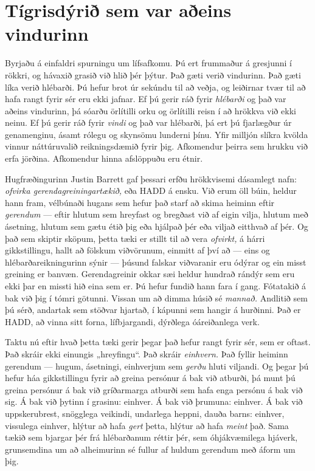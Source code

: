 \section*{Tígrisdýrið sem var aðeins vindurinn}

Byrjaðu á einfaldri spurningu um lífsafkomu. Þú ert frummaður á gresjunni í rökkri, og hávaxið grasið við hlið þér þýtur. Það gæti verið vindurinn. Það gæti líka verið hlébarði. Þú hefur brot úr sekúndu til að veðja, og leiðirnar tvær til að hafa rangt fyrir sér eru ekki jafnar. Ef þú gerir ráð fyrir \emph{hlébarði} og það var aðeins vindurinn, þá sóarðu örlítilli orku og örlítilli reisn í að hrökkva við ekki neinu. Ef þú gerir ráð fyrir \emph{vindi} og það var hlébarði, þá ert þú fjarlægður úr genamenginu, ásamt rólegu og skynsömu lunderni þínu. Yfir milljón slíkra kvölda vinnur náttúruvalið reikningsdæmið fyrir þig. Afkomendur þeirra sem hrukku við erfa jörðina. Afkomendur hinna afslöppuðu eru étnir.

Hugfræðingurinn Justin Barrett gaf þessari erfðu hrökkvisemi dásamlegt nafn: \emph{ofvirka gerendagreiningartækið,} eða HADD á ensku. Við erum öll búin, heldur hann fram, vélbúnaði hugans sem hefur það starf að skima heiminn eftir \emph{gerendum} — eftir hlutum sem hreyfast og bregðast við af eigin vilja, hlutum með ásetning, hlutum sem gætu étið þig eða hjálpað þér eða viljað eitthvað af þér. Og það sem skiptir sköpum, þetta tæki er stillt til að vera \emph{ofvirkt,} á hárri gikkstillingu, hallt að fölskum viðvörunum, einmitt af því að — eins og hlébarðareikningurinn sýnir — þúsund falskar viðvaranir eru ódýrar og ein misst greining er banvæn. Gerendagreinir okkar sæi heldur hundrað rándýr sem eru ekki þar en missti hið eina sem er. Þú hefur fundið hann fara í gang. Fótatakið á bak við þig í tómri götunni. Vissan um að dimma húsið sé \emph{mannað.} Andlitið sem þú sérð, andartak sem stöðvar hjartað, í kápunni sem hangir á hurðinni. Það er HADD, að vinna sitt forna, lífbjargandi, dýrðlega óáreiðanlega verk.

Taktu nú eftir hvað þetta tæki gerir þegar það hefur rangt fyrir sér, sem er oftast. Það skráir ekki einungis „hreyfingu“. Það skráir \emph{einhvern.} Það fyllir heiminn gerendum — hugum, ásetningi, einhverjum sem \emph{gerðu} hluti viljandi. Og þegar þú hefur háa gikkstillingu fyrir að greina persónur á bak við atburði, þá munt þú greina persónur á bak við gríðarmarga atburði sem hafa enga persónu á bak við sig. Á bak við þytinn í grasinu: einhver. Á bak við þrumuna: einhver. Á bak við uppskerubrest, snögglega veikindi, undarlega heppni, dauða barns: einhver, vissulega einhver, hlýtur að hafa \emph{gert} þetta, hlýtur að hafa \emph{meint} það. Sama tækið sem bjargar þér frá hlébarðanum réttir þér, sem óhjákvæmilega hjáverk, grunsemdina um að alheimurinn sé fullur af huldum gerendum með áform um þig.

